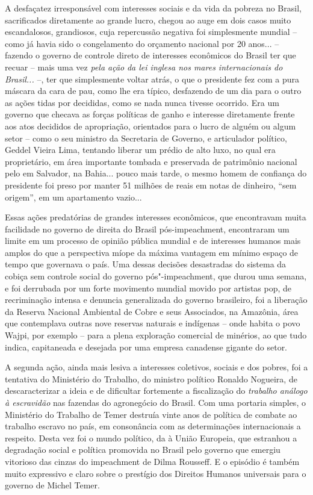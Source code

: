 A desfaçatez irresponsável com interesses sociais e da vida da pobreza
no Brasil, sacrificados diretamente ao grande lucro, chegou ao auge em
dois casos muito escandalosos, grandiosos, cuja repercussão negativa
foi simplesmente mundial -- como já havia sido o congelamento do
orçamento nacional por 20 anos... -- fazendo o governo de controle direto
de interesses econômicos do Brasil ter que recuar -- mais uma vez
\emph{pela ação} \emph{da lei inglesa nos mares internacionais do
Brasil...} --, ter que simplesmente voltar atrás, o que o presidente fez com a
pura máscara da cara de pau, como lhe era típico, desfazendo de um dia
para o outro as ações tidas por decididas, como se nada nunca tivesse
ocorrido. Era um governo que checava as forças políticas de ganho e
interesse diretamente frente aos atos decididos de apropriação,
orientados para o lucro de alguém ou algum setor -- como o seu ministro
da Secretaria de Governo, e articulador político, Geddel Vieira Lima,
tentando liberar um prédio de alto luxo, no qual era proprietário, em
área importante tombada e preservada de patrimônio nacional pelo  em Salvador,
na Bahia... pouco mais tarde, o mesmo homem de confiança do presidente
foi preso por manter 51 milhões de reais em notas de dinheiro, ``sem
origem'', em um apartamento vazio...

Essas ações predatórias de grandes interesses econômicos, que encontravam
muita facilidade no governo de direita do Brasil pós-impeachment,
encontraram um limite em um processo de opinião pública mundial e de
interesses humanos mais amplos do que a perspectiva míope da máxima
vantagem em mínimo espaço de tempo que governava o país.
Uma dessas decisões desastradas do sistema da cobiça sem
controle social do governo pós"-impeachment, que durou uma semana, e foi
derrubada por um forte movimento mundial movido por artistas pop, de
recriminação intensa e denuncia generalizada do governo brasileiro, foi
a liberação da Reserva Nacional Ambiental de Cobre e seus Associados, na
Amazônia, área que contemplava outras nove reservas naturais e indígenas
-- onde habita o povo Wajpi, por exemplo -- para a plena exploração
comercial de minérios, ao que tudo indica, capitaneada e desejada por
uma empresa canadense gigante do setor.

A segunda ação, ainda mais lesiva a interesses coletivos, sociais e dos
pobres, foi a tentativa do Ministério do Trabalho, do ministro político
Ronaldo Nogueira, de descaracterizar a ideia e de dificultar fortemente
a fiscalização do \emph{trabalho análogo à escravidão} nas fazendas do
agronegócio do Brasil. Com uma portaria simples, o Ministério do
Trabalho de Temer destruía vinte anos de política de combate ao trabalho
escravo no país, em consonância com as determinações internacionais a
respeito. Desta vez foi o mundo político, da  à União Europeia, que
estranhou a degradação social e política promovida no Brasil pelo
governo que emergiu vitorioso das cinzas do impeachment de Dilma
Rousseff. E o episódio é também muito expressivo e claro sobre o
prestígio dos Direitos Humanos universais para o governo de Michel
Temer.

